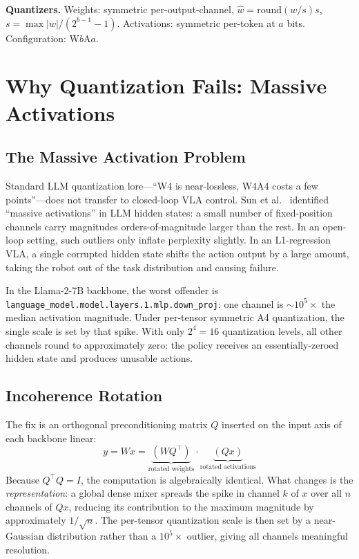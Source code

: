 \documentclass[conference]{IEEEtran}
\begin{document}
\textbf{Quantizers.} Weights: symmetric per-output-channel,
$\hat{w}=\mathrm{round}(w/s)s$, $s=\max|w|/(2^{b-1}-1)$. Activations: symmetric per-token
at $a$ bits. Configuration: W$b$A$a$.

\section{Why Quantization Fails: Massive Activations}
\label{sec:method}

\subsection{The Massive Activation Problem}
\label{sec:massive}

Standard LLM quantization lore---``W4 is near-lossless, W4A4 costs a few points''---does
not transfer to closed-loop VLA control. Sun et al.~\cite{sun2024massive} identified
``massive activations'' in LLM hidden states: a small number of fixed-position channels
carry magnitudes orders-of-magnitude larger than the rest. In an open-loop setting, such
outliers only inflate perplexity slightly. In an L1-regression VLA, a single corrupted
hidden state shifts the action output by a large amount, taking the robot out of the task
distribution and causing failure.

In the Llama-2-7B backbone, the worst offender is
\texttt{language\_model.model.layers.1.mlp.down\_proj}: one channel is
$\sim\!10^5\times$ the median activation magnitude. Under per-tensor symmetric A4
quantization, the single scale is set by that spike. With only $2^4=16$ quantization
levels, all other channels round to approximately zero: the policy receives an
essentially-zeroed hidden state and produces unusable actions.

\subsection{Incoherence Rotation}
\label{sec:rotation_method}

The fix is an orthogonal preconditioning matrix $Q$ inserted on the input axis of each
backbone linear:
\begin{equation}
  y = Wx = \underbrace{(WQ^\top)}_{\text{rotated weights}} \cdot \underbrace{(Qx)}_{\text{rotated activations}}
\end{equation}
Because $Q^\top Q = I$, the computation is algebraically identical. What changes is the
\emph{representation}: a global dense mixer spreads the spike in channel $k$ of $x$ over
all $n$ channels of $Qx$, reducing its contribution to the maximum magnitude by
approximately $1/\sqrt{n}$. The per-tensor quantization scale is then set by a
near-Gaussian distribution rather than a $10^5\times$ outlier, giving all channels
meaningful resolution.
\end{document}
